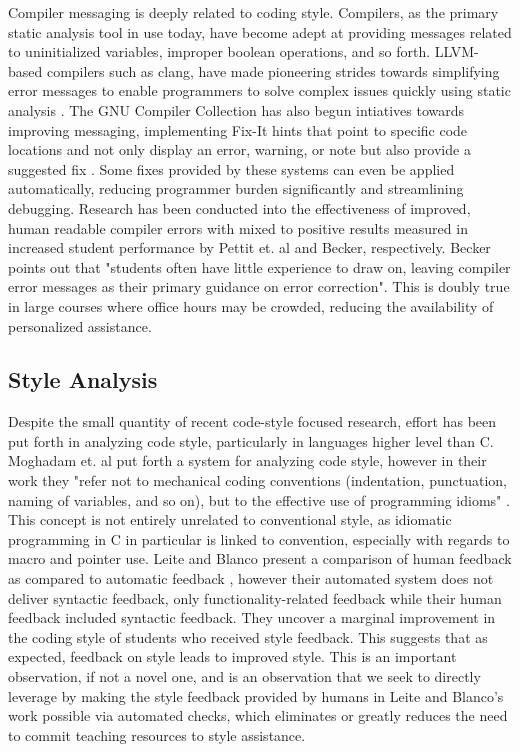 \documentclass[sigconf]{acmart}
\begin{document}
Compiler messaging is deeply related to coding style. Compilers, as the primary static
analysis tool in use today, have become adept at providing messages related to
uninitialized variables, improper boolean operations, and so forth. LLVM-based compilers
such as clang, have made pioneering strides towards simplifying error messages to enable
programmers to solve complex issues quickly using static analysis
\cite{ClangStaticChecks}. The GNU Compiler Collection has also begun intiatives towards
improving messaging, implementing Fix-It hints that point to specific code locations and
not only display an error, warning, or note but also provide a suggested fix
\cite{GCCFixItHints}. Some fixes provided by these systems can even be applied
automatically, reducing programmer burden significantly and streamlining debugging.
Research has been conducted into the effectiveness of improved, human readable compiler
errors with mixed \cite{10.1145/3017680.3017768} to positive results
\cite{10.1145/2839509.2844584} measured in increased student performance by Pettit et. al
and Becker, respectively. Becker points out that "students often have little experience
to draw on, leaving compiler error messages as their primary guidance on error
correction". This is doubly true in large courses where office hours may be crowded,
reducing the availability of personalized assistance.
\\

\subsection{Style Analysis}

Despite the small quantity of recent code-style focused research, effort has been put
forth in analyzing code style, particularly in languages higher level than C. Moghadam
et. al put forth a system for analyzing code style, however in their work they "refer
not to mechanical coding conventions (indentation, punctuation, naming of variables, and
so on), but to the effective use of programming idioms" \cite{10.1145/2724660.2728672}.
This concept is not entirely unrelated to conventional style, as idiomatic programming
in C in particular is linked to convention, especially with regards to macro and pointer
use. Leite and Blanco present a comparison of human feedback as compared to automatic
feedback \cite{10.1145/3328778.3366921}, however their automated system does not deliver
syntactic feedback, only functionality-related feedback while their human feedback
included syntactic feedback. They uncover a marginal improvement in the coding style of
students who received style feedback. This suggests that as expected, feedback on style
leads to improved style. This is an important observation, if not a novel one, and is
an observation that we seek to directly leverage by making the style feedback provided
by humans in Leite and Blanco's work possible via automated checks, which eliminates or
greatly reduces the need to commit teaching resources to style assistance.
\\
\end{document}
